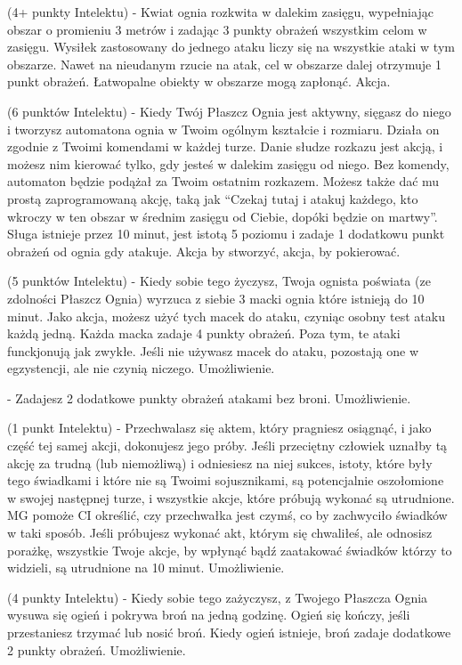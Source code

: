 { (4+ punkty Intelektu) - Kwiat ognia rozkwita w dalekim zasięgu, wypełniając obszar o promieniu 3 metrów i zadając 3 punkty obrażeń wszystkim celom w zasięgu. Wysiłek zastosowany do jednego ataku liczy się na wszystkie ataki w tym obszarze. Nawet na nieudanym rzucie na atak, cel w obszarze dalej otrzymuje 1 punkt obrażeń. Łatwopalne obiekty w obszarze mogą zapłonąć. Akcja.

 (6 punktów Intelektu) - Kiedy Twój Płaszcz Ognia jest aktywny, sięgasz do niego i tworzysz automatona ognia w Twoim ogólnym  kształcie i rozmiaru. Działa on zgodnie z Twoimi komendami w każdej turze. Danie słudze rozkazu jest akcją, i możesz nim kierować tylko, gdy jesteś w dalekim zasięgu od niego. Bez komendy, automaton będzie podążał za Twoim ostatnim rozkazem.  Możesz także dać mu prostą zaprogramowaną akcję, taką jak ``Czekaj tutaj i atakuj każdego, kto wkroczy w ten obszar w średnim zasięgu od Ciebie, dopóki będzie on martwy''.  Sługa istnieje przez 10 minut, jest istotą 5 poziomu i zadaje 1 dodatkowu punkt obrażeń od ognia gdy atakuje. Akcja by stworzyć, akcja, by pokierować.

 (5 punktów Intelektu) - Kiedy sobie tego życzysz, Twoja ognista poświata (ze zdolności Płaszcz Ognia) wyrzuca z siebie 3 macki ognia które istnieją do 10 minut. Jako akcja, możesz użyć tych macek do ataku, czyniąc osobny test ataku każdą jedną. Każda macka zadaje 4 punkty obrażeń. Poza tym, te ataki funckjonują jak zwykłe. Jeśli nie używasz macek do ataku, pozostają one w egzystencji, ale nie czynią niczego. Umożliwienie.

 - Zadajesz 2 dodatkowe punkty obrażeń atakami bez broni. Umożliwienie.

 (1 punkt Intelektu) - Przechwalasz się aktem, który pragniesz osiągnąć, i jako część tej samej akcji, dokonujesz jego próby. Jeśli przeciętny człowiek uznałby tą akcję za trudną (lub niemożliwą) i odniesiesz na niej sukces, istoty, które były tego świadkami i które nie są Twoimi sojusznikami, są potencjalnie oszołomione w swojej następnej turze, i wszystkie akcje, które próbują wykonać są utrudnione. MG pomoże CI określić, czy przechwałka jest czymś, co by zachwyciło świadków w taki sposób. Jeśli próbujesz wykonać akt, którym się chwaliłeś, ale odnosisz porażkę, wszystkie Twoje akcje, by wpłynąć bądź zaatakować świadków którzy to widzieli, są utrudnione na 10 minut. Umożliwienie.

 (4 punkty Intelektu) - Kiedy sobie tego zażyczysz, z Twojego Płaszcza Ognia wysuwa się ogień i pokrywa broń na jedną godzinę. Ogień się kończy, jeśli przestaniesz trzymać lub nosić broń. Kiedy ogień istnieje, broń zadaje dodatkowe 2 punkty obrażeń. Umożliwienie. 

}
